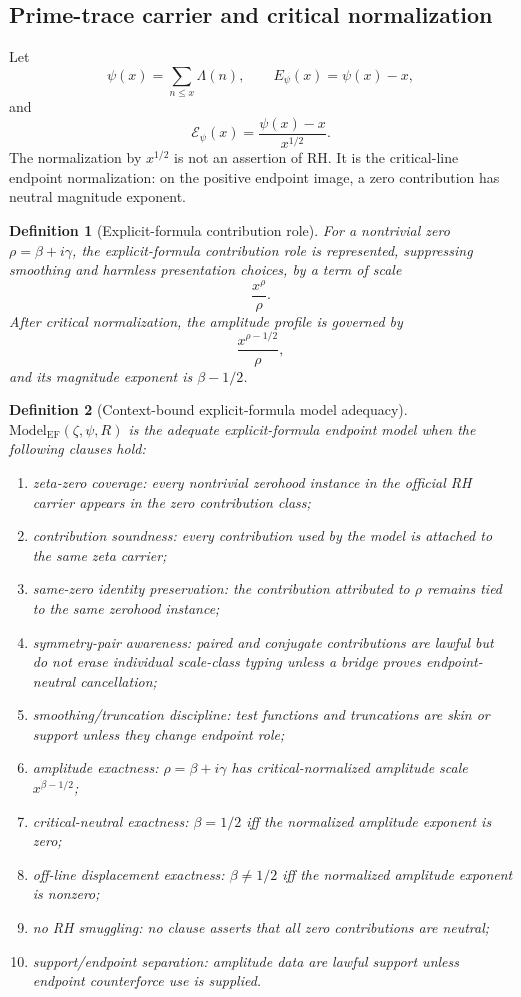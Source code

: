 \documentclass[11pt]{article}
\newtheorem{definition}{Definition}[section]
\newcommand{\ModelEF}{\mathrm{Model}_{\mathrm{EF}}}
\newcommand{\psierr}{E_{\psi}}
\newcommand{\psinorm}{\mathcal E_{\psi}}
\begin{document}
\subsection{Prime-trace carrier and critical normalization}

Let
\[
\psi(x)=\sum_{n\le x}\Lambda(n),\qquad \psierr(x)=\psi(x)-x,
\]
and
\[
\psinorm(x)=\frac{\psi(x)-x}{x^{1/2}}.
\]
The normalization by \(x^{1/2}\) is not an assertion of RH.  It is the critical-line endpoint normalization: on the positive endpoint image, a zero contribution has neutral magnitude exponent.

\begin{definition}[Explicit-formula contribution role]
For a nontrivial zero \(\rho=\beta+i\gamma\), the explicit-formula contribution role is represented, suppressing smoothing and harmless presentation choices, by a term of scale
\[
\frac{x^\rho}{\rho}.
\]
After critical normalization, the amplitude profile is governed by
\[
\frac{x^{\rho-1/2}}{\rho},
\]
and its magnitude exponent is \(\beta-1/2\).
\end{definition}

\begin{definition}[Context-bound explicit-formula model adequacy]
\(\ModelEF(\zeta,\psi,R)\) is the adequate explicit-formula endpoint model when the following clauses hold:
\begin{enumerate}[label=(EF\arabic*)]
\item zeta-zero coverage: every nontrivial zerohood instance in the official RH carrier appears in the zero contribution class;
\item contribution soundness: every contribution used by the model is attached to the same zeta carrier;
\item same-zero identity preservation: the contribution attributed to \(\rho\) remains tied to the same zerohood instance;
\item symmetry-pair awareness: paired and conjugate contributions are lawful but do not erase individual scale-class typing unless a bridge proves endpoint-neutral cancellation;
\item smoothing/truncation discipline: test functions and truncations are skin or support unless they change endpoint role;
\item amplitude exactness: \(\rho=\beta+i\gamma\) has critical-normalized amplitude scale \(x^{\beta-1/2}\);
\item critical-neutral exactness: \(\beta=1/2\) iff the normalized amplitude exponent is zero;
\item off-line displacement exactness: \(\beta\ne 1/2\) iff the normalized amplitude exponent is nonzero;
\item no RH smuggling: no clause asserts that all zero contributions are neutral;
\item support/endpoint separation: amplitude data are lawful support unless endpoint counterforce use is supplied.
\end{enumerate}
\end{definition}
\end{document}
